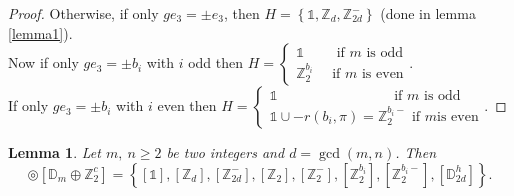 \documentclass[11pt,a4paper]{amsart}
\newtheorem{lem}[thm]{Lemma}
\theoremstyle{definition}
\newcommand{\ZZ}{\mathbb{Z}}                %
\newcommand{\DD}{\mathbb{D}}                %
\newcommand{\1}{\mathds{1}}		            %
\newcommand{\set}[1]{\left\{#1\right\}}     %
\begin{document}
\begin{proof}
Otherwise, if only $ge_3=\pm e_3$, then $H=\set{\1,\ZZ_d,\ZZ_{2d}^-}$ (done in lemma \ref{lemma1}).\\
Now if only $ge_3=\pm b_i$ with $i$ odd then $H=\begin{cases} \1 \qquad \text{  if $m$ is odd} \\ \ZZ_2^{b_i} \quad \text{  if $m$ is even} \end{cases}$.\\
If only $ge_3=\pm b_i$ with $i$ even then $H=\begin{cases} \1 \qquad \qquad \qquad \qquad \text{  if $m$ is odd} \\ \1\cup -r(b_i,\pi)=\ZZ_2^{b_i-} \text{  if $m$is even} \end{cases}$.
\end{proof}

\begin{lem}
Let $m,\ n \geq 2$ be two integers and $d=\gcd(m,n)$. Then
\begin{equation*}
[\DD_{2n}^{h}] \circledcirc [\DD_m \oplus\ZZ_2^c]=\set{[\1],[\ZZ_d],[\ZZ_{2d}^-],[\ZZ_2],[\ZZ_2^-],[\ZZ_2^{b_i}],[\ZZ_2^{b_i-}],[\DD_{2d}^h]}.
\end{equation*}
\end{lem}
\end{document}
